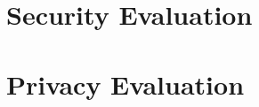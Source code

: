 \section{Security Evaluation}\label{sec:implSecurity}
\section{Privacy Evaluation}\label{sec:implPrivacy}